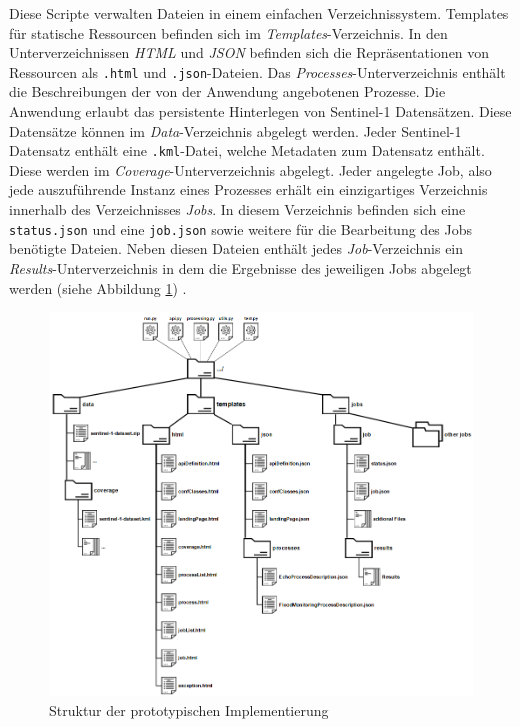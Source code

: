Diese Scripte verwalten Dateien in einem einfachen Verzeichnissystem. Templates für statische Ressourcen befinden sich im \emph{Templates}-Verzeichnis. In den Unterverzeichnissen 
\emph{HTML} und \emph{JSON} befinden sich die Repräsentationen von Ressourcen als \verb|.html| und \verb|.json|-Dateien.  
Das \emph{Processes}-Unterverzeichnis enthält die Beschreibungen der von der Anwendung angebotenen Prozesse. 
Die Anwendung erlaubt das persistente Hinterlegen von Sentinel-1 Datensätzen. Diese Datensätze können im \emph{Data}-Verzeichnis 
abgelegt werden. Jeder Sentinel-1 Datensatz enthält eine \verb|.kml|-Datei, welche Metadaten zum Datensatz enthält. Diese werden im \emph{Coverage}-Unterverzeichnis abgelegt. 
Jeder angelegte Job, also jede auszuführende Instanz eines Prozesses erhält ein einzigartiges Verzeichnis innerhalb des Verzeichnisses \emph{Jobs}. In diesem 
Verzeichnis befinden sich eine \verb|status.json| und eine \verb|job.json| sowie weitere für die Bearbeitung des Jobs benötigte Dateien. 
Neben diesen Dateien enthält jedes \emph{Job}-Verzeichnis ein \emph{Results}-Unterverzeichnis in dem die Ergebnisse des jeweiligen Jobs abgelegt werden (siehe Abbildung \ref{structure}) \cite{code}.

\begin{figure}[H]
    \centering
    \includegraphics[width=\textwidth]{Bilder/folders.png}
    \caption{Struktur der prototypischen Implementierung \cite{code}}
    \label{structure}
\end{figure}

